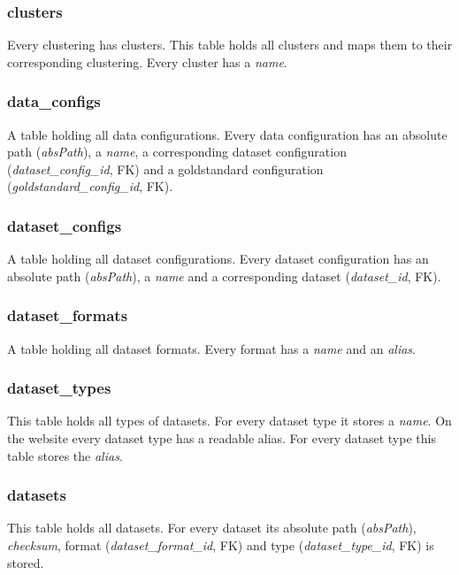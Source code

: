 		\subsubsection{clusters                                                   } Every clustering has clusters. This table holds all clusters and maps them to their corresponding clustering. Every cluster has a \textit{name}.
		
		\subsubsection{data\_configs                                                 } A table holding all data configurations. Every data configuration has an absolute path (\textit{absPath}), a \textit{name}, a corresponding dataset configuration (\textit{dataset\_config\_id}, FK) and a goldstandard configuration (\textit{goldstandard\_config\_id}, FK).
		
		\subsubsection{dataset\_configs                                              } A table holding all dataset configurations. Every dataset configuration has an absolute path (\textit{absPath}), a \textit{name} and a corresponding dataset (\textit{dataset\_id}, FK).
		
		\subsubsection{dataset\_formats                                              } A table holding all dataset formats. Every format has a \textit{name} and an \textit{alias}.
		
		\subsubsection{dataset\_types                                                } This table holds all types of datasets. For every dataset type it stores a \textit{name}. On the website every dataset type has a readable alias. For every dataset type this table stores the \textit{alias}.
		
		\subsubsection{datasets                                                     } This table holds all datasets. For every dataset its absolute path (\textit{absPath}), \textit{checksum}, format (\textit{dataset\_format\_id}, FK) and type (\textit{dataset\_type\_id}, FK) is stored. 
		
